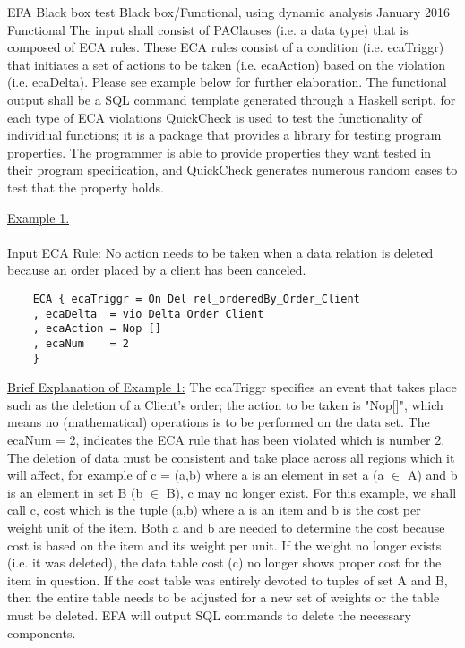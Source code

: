 \documentclass[12pt]{report}
\begin{document}
{EFA Black box test}  %
{Black box/Functional, using dynamic analysis}  
{January 2016 }
{Functional}
{The input shall consist of PAClauses (i.e. a data type) that is composed of 
ECA rules. These ECA rules consist of a condition (i.e. ecaTriggr) that 
initiates a set of actions to be taken (i.e. ecaAction) based on the violation 
(i.e. ecaDelta). Please see example below for further elaboration.}
{The functional output shall be a SQL command template generated through a 
Haskell script, for each type of ECA violations}
{QuickCheck  is used to test the functionality of individual functions; it is a 
package that provides a library for testing program properties. The programmer 
is able to provide properties they want tested in their program specification, 
and QuickCheck generates numerous random cases to test that the property 
holds\cite{hackage}. }

\underline{Example 1.}
\paragraph{}
Input ECA Rule: No action needs to be taken when a data relation is 
deleted because 
an order placed by a client has been canceled.
	\begin{verbatim}
	ECA { ecaTriggr = On Del rel_orderedBy_Order_Client
	, ecaDelta  = vio_Delta_Order_Client
	, ecaAction = Nop []
	, ecaNum    = 2
	} 
	\end{verbatim} 	
\underline{Brief Explanation of Example 1:} \newline \newline \indent
The ecaTriggr specifies an event that takes place such as the deletion of a 
Client's order; the action to be taken is "Nop[]", which means no 
(mathematical) operations is to be performed on the data set. The ecaNum = 2, 
indicates the ECA rule that has been violated which is number 2. The deletion 
of data must be consistent and take place across all regions which it will 
affect, for example of c = (a,b) where a is an element in set a (a $\in$ A) and 
b is an element in set B (b $\in$ B), c may no longer exist. For this example, 
we shall call c, cost which is the tuple (a,b) where a is an item and b is the 
cost per weight unit of the item. Both a and b are needed to determine the cost 
because cost is based on the item and its weight per unit. If the weight no 
longer exists (i.e. it was deleted), the data table cost (c) no longer shows 
proper cost for the item in question. If the cost table was entirely devoted to 
tuples of set A and B, then the entire table needs to be adjusted for a new set 
of weights or the table must be deleted. EFA will output SQL commands to delete 
the necessary components.
\end{document}
